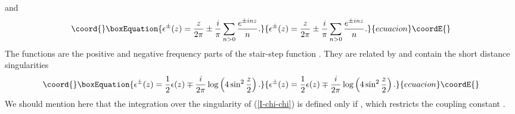 \documentclass[a4paper,12pt]{article}
\begin{document}
and
\begin{equation}\coord{}\boxEquation{\label{eps_pm}
\epsilon^{\pm}(z)=
\frac{z}{2\pi}\pm\frac{i}{\pi}\sum_{n>0}\frac{e^{\pm inz}}{n}.
}{\epsilon^{\pm}(z)=
\frac{z}{2\pi}\pm\frac{i}{\pi}\sum_{n>0}\frac{e^{\pm inz}}{n}.
}{ecuacion}\coordE{}\end{equation}
The \coordHE{} functions are the positive and negative
frequency parts of the stair-step function
\coordHE{}. They are related by
\coordHE{} and contain the short distance
singularities
\begin{equation}\coord{}\boxEquation{\label{eps_pm-eps}
\epsilon^{\pm}(z)=\frac{1}{2}
\epsilon(z)\mp \frac{i}{2\pi}\log\left(4\sin^2\frac{z}{2}\right).
}{\epsilon^{\pm}(z)=\frac{1}{2}
\epsilon(z)\mp \frac{i}{2\pi}\log\left(4\sin^2\frac{z}{2}\right).
}{ecuacion}\coordE{}\end{equation}
We should mention here that the integration over the singularity
\coordHE{} of (\ref{I-chi-chi}) is defined only if \coordHE{}, which restricts the coupling constant
\coordHE{}.
\end{document}
